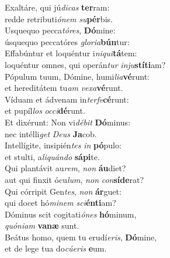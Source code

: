 \evenverse Exaltáre, qui jú\textit{di}\textit{cas} \textbf{ter}ram:~\*\\
\evenverse redde retributi\textit{ó}\textit{nem} \textit{su}\textbf{pér}bis.\\
\oddverse Usquequo pecca\textit{tó}\textit{res}, \textbf{Dó}mine:~\*\\
\oddverse úsquequo peccatóres \textit{glo}\textit{ri}\textit{a}\textbf{bún}tur:\\
\evenverse Effabúntur et loquéntur i\textit{ni}\textit{qui}\textbf{tá}tem:~\*\\
\evenverse loquéntur omnes, qui operán\textit{tur} \textit{in}\textit{ju}\textbf{stí}\textbf{ti}am?\\
\oddverse Pópulum tuum, Dómine, humi\textit{li}\textit{a}\textbf{vé}runt:~\*\\
\oddverse et hereditátem tu\textit{am} \textit{ve}\textit{xa}\textbf{vé}runt.\\
\evenverse Víduam et ádvenam in\textit{ter}\textit{fe}\textbf{cé}runt:~\*\\
\evenverse et pupíl\textit{los} \textit{oc}\textit{ci}\textbf{dé}runt.\\
\oddverse Et dixérunt: Non vi\textit{dé}\textit{bit} \textbf{Dó}minus:~\*\\
\oddverse nec intélli\textit{get} \textit{De}\textit{us} \textbf{Ja}cob.\\
\evenverse Intellígite, insipién\textit{tes} \textit{in} \textbf{pó}pulo:~\*\\
\evenverse et stulti, a\textit{li}\textit{quán}\textit{do} \textbf{sá}\textbf{pi}te.\\
\oddverse Qui plantávit au\textit{rem}, \textit{non} \textbf{áu}diet?~\*\\
\oddverse aut qui finxit ócu\textit{lum}, \textit{non} \textit{con}\textbf{sí}\textbf{de}rat?\\
\evenverse Qui córripit Gen\textit{tes}, \textit{non} \textbf{ár}guet:~\*\\
\evenverse qui docet hó\textit{mi}\textit{nem} \textit{sci}\textbf{én}\textbf{ti}am?\\
\oddverse Dóminus scit cogitati\textit{ó}\textit{nes} \textbf{hó}minum,~\*\\
\oddverse \textit{quó}\textit{ni}\textit{am} \textbf{va}\textbf{næ} sunt.\\
\evenverse Beátus homo, quem tu erudí\textit{e}\textit{ris}, \textbf{Dó}mine,~\*\\
\evenverse et de lege tua do\textit{cú}\textit{e}\textit{ris} \textbf{e}um.\\
